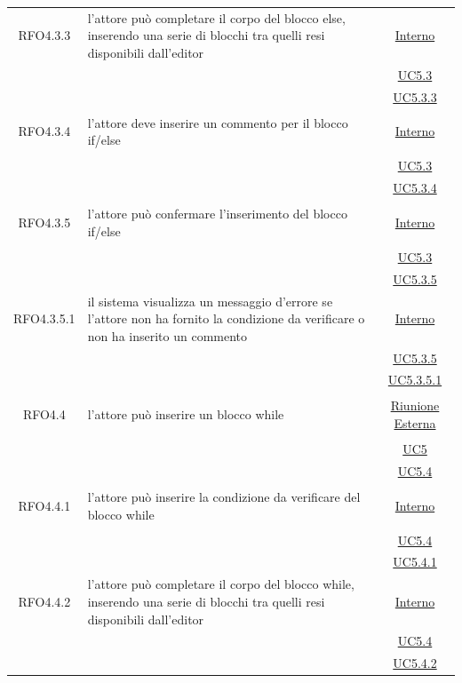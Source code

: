 \begin{longtable}{|c|>{\centering}m{7cm}|c|}
\hypertarget{RFO4.3.3}{RFO4.3.3} & l'attore può completare il corpo del blocco else, inserendo una serie di blocchi tra quelli resi disponibili dall'editor   &\hyperlink{Interno}{Interno}\\
& &\hyperref[UC5.3]{UC5.3}\\
& &\hyperref[UC5.3.3]{UC5.3.3}\\ \hline

\hypertarget{RFO4.3.4}{RFO4.3.4} & l'attore deve inserire un commento per il blocco if/else & \hyperlink{Interno}{Interno}\\
& &\hyperref[UC5.3]{UC5.3}\\
& &\hyperref[UC5.3.4]{UC5.3.4}\\ \hline

\hypertarget{RFO4.3.5}{RFO4.3.5} & l'attore può confermare l'inserimento del blocco if/else & \hyperlink{Interno}{Interno}\\
& &\hyperref[UC5.3]{UC5.3}\\
& &\hyperref[UC5.3.5]{UC5.3.5}\\ \hline

\hypertarget{RFO4.3.5.1}{RFO4.3.5.1} & il sistema visualizza un messaggio d'errore se l'attore non ha fornito la condizione da verificare o non ha inserito un commento & \hyperlink{Interno}{Interno}\\
& &\hyperref[UC5.3.5]{UC5.3.5}\\
& &\hyperref[UC5.3.5.1]{UC5.3.5.1}\\ \hline

\hypertarget{RFO4.4}{RFO4.4} & l'attore può inserire un blocco while & \hyperlink{Riunione Esterna}{Riunione Esterna}\\
& &\hyperref[UC5]{UC5}\\
& &\hyperref[UC5.4]{UC5.4}\\ \hline

\hypertarget{RFO4.4.1}{RFO4.4.1} & l'attore può inserire la condizione da verificare del blocco while & \hyperlink{Interno}{Interno}\\
& &\hyperref[UC5.4]{UC5.4}\\
& &\hyperref[UC5.4.1]{UC5.4.1}\\ \hline

\hypertarget{RFO4.4.2}{RFO4.4.2} & l'attore può completare il corpo del blocco while, inserendo una serie di blocchi tra quelli resi disponibili dall'editor & \hyperlink{Interno}{Interno}\\
& &\hyperref[UC5.4]{UC5.4}\\
& &\hyperref[UC5.4.2]{UC5.4.2}\\ \hline


\end{longtable}
